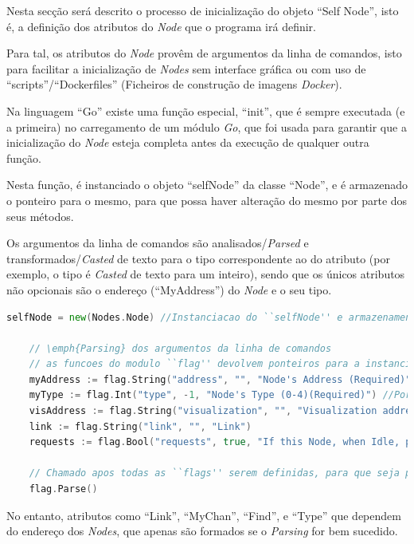 Nesta secção será descrito o processo de inicialização do objeto ``Self Node'', 
isto é, a definição dos atributos do \emph{Node} que o programa irá definir.

Para tal, os atributos do \emph{Node} provêm de argumentos da linha de comandos, isto para facilitar
a inicialização de \emph{Nodes} sem interface gráfica ou com uso de ``scripts''/``Dockerfiles'' (Ficheiros de construção de imagens \emph{Docker}).

Na linguagem ``Go'' existe uma função especial, ``init'', que é sempre executada (e a primeira) no carregamento de um módulo \emph{Go},
que foi usada para garantir que a inicialização do \emph{Node} esteja completa antes da execução de qualquer outra função.



Nesta função, é instanciado o objeto ``selfNode'' da classe ``Node'', e é armazenado o ponteiro para o mesmo, para que possa haver alteração do mesmo
por parte dos seus métodos.

Os argumentos da linha de comandos são analisados/\emph{Parsed} e transformados/\emph{Casted} de texto para o tipo
correspondente ao do atributo (por exemplo, o tipo é \emph{Casted} de texto para um inteiro), sendo que 
os únicos atributos não opcionais são o endereço (``MyAddress'') do \emph{Node} e o seu tipo.


\begin{lstlisting}[caption={\emph{Switch} de decisão do comportamento.},language=Go]
	selfNode = new(Nodes.Node) //Instanciacao do ``selfNode'' e armazenamento do ponteiro para o mesmo

	// \emph{Parsing} dos argumentos da linha de comandos
	// as funcoes do modulo ``flag'' devolvem ponteiros para a instanciacao de cada argumento \emph{Parsed}
	myAddress := flag.String("address", "", "Node's Address (Required)")
	myType := flag.Int("type", -1, "Node's Type (0-4)(Required)") //Por definicao de todos os tipos
	visAddress := flag.String("visualization", "", "Visualization address.")
	link := flag.String("link", "", "Link")
	requests := flag.Bool("requests", true, "If this Node, when Idle, preforms Object Requests")

	// Chamado apos todas as ``flags'' serem definidas, para que seja processado o \emph{Parsing}
	flag.Parse()

\end{lstlisting}

No entanto, atributos como ``Link'', ``MyChan'', ``Find'', e ``Type'' que dependem do endereço dos \emph{Nodes},
que apenas são formados se o \emph{Parsing} for bem sucedido.

